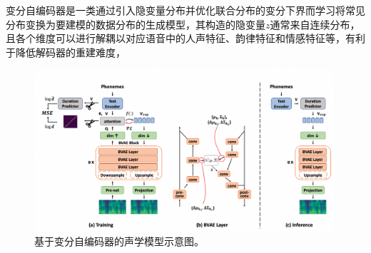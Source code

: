变分自编码器是一类通过引入隐变量分布并优化联合分布的变分下界而学习将常见分布变换为要建模的数据分布的生成模型，其构造的隐变量$z$通常来自连续分布，且各个维度可以进行解耦以对应语音中的人声特征、韵律特征和情感特征等，有利于降低解码器的重建难度，
\begin{figure}[!ht]
  \includegraphics[width=0.99\textwidth]{figure/related/bvaetts.png}
  \caption{基于变分自编码器的声学模型示意图\citep{lee2020bidirectional}。}
\end{figure}

